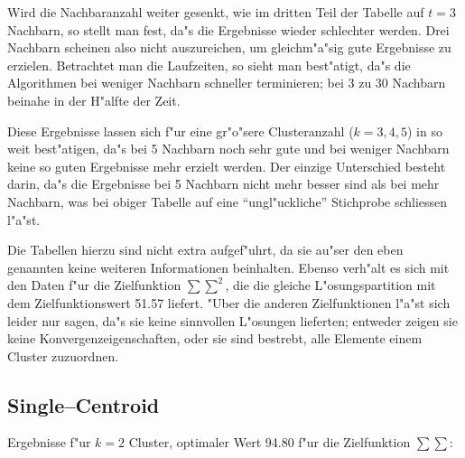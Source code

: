 Wird die Nachbaranzahl weiter
gesenkt, wie im dritten Teil der Tabelle auf $t=3$ Nachbarn, 
so stellt man fest, da"s die
Ergebnisse wieder schlechter werden. Drei Nachbarn scheinen also nicht
auszureichen, um gleichm"a"sig gute Ergebnisse zu erzielen.
Betrachtet man die Laufzeiten, so sieht man 
best"atigt, da"s die Algorithmen bei weniger Nachbarn schneller
terminieren; bei 3 zu 30 Nachbarn beinahe in der H"alfte der Zeit.

Diese Ergebnisse lassen sich f"ur eine gr"o"sere Clusteranzahl ($k=3,4,5$)
in so weit best"atigen, da"s bei 5 Nachbarn noch sehr gute und bei weniger
Nachbarn keine so guten Ergebnisse mehr erzielt werden.
Der einzige Unterschied besteht darin, da"s die Ergebnisse bei 5 Nachbarn nicht
mehr besser sind als bei mehr Nachbarn, was bei obiger Tabelle auf eine
"`ungl"uckliche"' Stichprobe schliessen l"a"st.

Die Tabellen hierzu sind nicht extra aufgef"uhrt, da sie au"ser den eben
genannten keine weiteren Informationen beinhalten. Ebenso verh"alt es sich
mit den Daten f"ur die Zielfunktion $\sum\sum^2$, die die gleiche
L"osungspartition mit dem Zielfunktionswert 51.57 liefert. "Uber die 
anderen Zielfunktionen l"a"st sich leider nur sagen, da"s sie keine
sinnvollen L"osungen lieferten; entweder zeigen sie keine 
Kon\-ver\-genz\-ei\-gen\-schaf\-ten, oder sie sind bestrebt, alle Elemente einem
Cluster zuzuordnen.


\subsection*{Single--Centroid}

Ergebnisse f"ur $k=2$ Cluster, optimaler Wert 94.80 f"ur die Zielfunktion 
$\sum\sum$:

